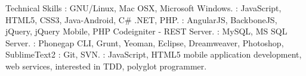 \documentclass{resume}
\author{Rahmathullah M}
\begin{document}
\maketitle



\begin{category}{Technical Skills}
  : GNU/Linux, Mac OSX, Microsoft Windows.
  : JavaScript, HTML5, CSS3, Java-Android, C\# .NET, PHP.
  : AngularJS, BackboneJS, jQuery, jQuery Mobile, PHP Codeigniter - REST Server.
  : MySQL, MS SQL Server.
  : Phonegap CLI, Grunt, Yeoman, Eclipse, Dreamweaver, Photoshop, SublimeText2
  : Git, SVN.
  : JavaScript, HTML5 mobile application development, web services, interested in TDD, polyglot programmer.
\end{category}

\end{document}
